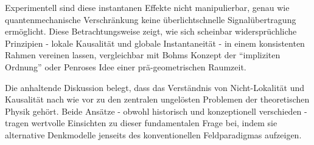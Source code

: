 Experimentell sind diese instantanen Effekte nicht manipulierbar, genau wie quantenmechanische Verschränkung keine überlichtschnelle Signalübertragung ermöglicht. Diese Betrachtungsweise
zeigt, wie sich scheinbar widersprüchliche Prinzipien - lokale Kausalität und globale Instantaneität - in einem konsistenten Rahmen vereinen lassen, vergleichbar mit Bohms Konzept der
\enquote{impliziten Ordnung} oder Penroses Idee einer prä-geometrischen Raumzeit.

Die anhaltende Diskussion belegt, dass das Verständnis von Nicht-Lokalität und Kausalität nach wie vor zu den zentralen ungelösten Problemen der theoretischen Physik gehört.
Beide Ansätze - obwohl historisch und konzeptionell verschieden - tragen wertvolle Einsichten zu dieser fundamentalen Frage bei, indem sie alternative Denkmodelle jenseits des
konventionellen Feldparadigmas aufzeigen.
